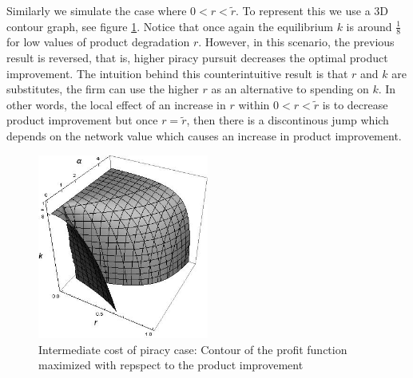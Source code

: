 Similarly we simulate the case where $0<r<\tilde{r}$. To represent this we use a 3D contour graph, see figure \ref{endk2}. Notice that once again the equilibrium $k$ is around $\frac{1}{8}$ for low values of product degradation $r$. However, in this scenario, the previous result is reversed, that is, higher piracy pursuit decreases the optimal product improvement. The intuition behind this counterintuitive result is that $r$ and $k$ are substitutes, the firm can use the higher $r$ as an alternative to spending on $k$. In other words, the local effect of an increase in $r$ within $0<r<\tilde{r}$ is to decrease product improvement but once $r=\tilde{r}$, then there is a discontinous jump which depends on the network value which causes an increase in product improvement. 


\begin{figure}[t!] 
\centering
\includegraphics[width=0.5\textwidth]{./figures/Endogenousksimulation.jpg}
\caption{Intermediate cost of piracy case: Contour of the profit function maximized with repspect to the product improvement}
\label{endk2}
\end{figure}



